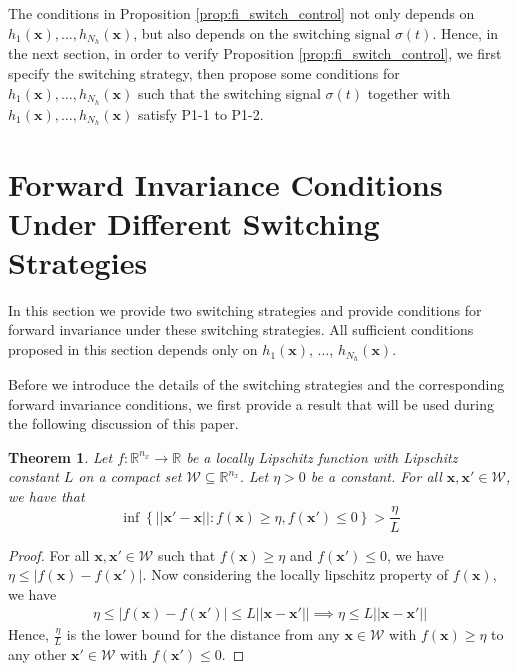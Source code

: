 \documentclass[letterpaper, 10 pt, conference]{ieeeconf}  %
\newtheorem{theorem}{Theorem}
\begin{document}
The conditions in Proposition \ref{prop:fi_switch_control} not only depends on $h_1(\mathbf{x}),...,h_{N_h}(\mathbf{x})$, but also depends on the switching signal $\sigma(t)$. Hence, in the next section, in order to verify Proposition \ref{prop:fi_switch_control}, we first specify the switching strategy, then propose some conditions for $h_1(\mathbf{x}),\dots,h_{N_h}(\mathbf{x})$ such that the switching signal $\sigma(t)$ together with $h_1(\mathbf{x}),\dots, h_{N_h}(\mathbf{x})$ satisfy P1-1 to P1-2. 
\section{Forward Invariance Conditions Under Different Switching Strategies}
\label{sec:strategies}

In this section we provide two switching strategies and provide conditions for forward invariance under these switching strategies. All sufficient conditions proposed in this section depends only on $h_1(\mathbf{x})$, $\dots$, $h_{N_h}(\mathbf{x})$. 

Before we introduce the details of the switching strategies and the corresponding forward invariance conditions, we first provide a result that will be used during the following discussion of this paper.

\begin{theorem}
\label{thm:positive_switching_dist}
     Let $f: \mathbb{R}^{n_x}\rightarrow\mathbb{R}$ be a locally Lipschitz function with Lipschitz constant $L$ on a compact set $\mathcal{W}\subseteq\mathbb{R}^{n_x}$. Let $\eta > 0$ be a constant. For all $\mathbf{x}, \mathbf{x}'\in\mathcal{W}$, we have that 
     \begin{equation*}
         \inf \left\{ ||\mathbf{x}'-\mathbf{x}|| : f(\mathbf{x})\geq \eta, f(\mathbf{x}')\leq 0 \right\} > \frac{\eta}{L}
     \end{equation*}
\end{theorem}
\begin{proof}
     For all $\mathbf{x},\mathbf{x}'\in\mathcal{W}$ such that $f(\mathbf{x})\geq \eta$ and $f(\mathbf{x}')\leq 0$, we have $\eta \leq |f(\mathbf{x}) - f(\mathbf{x}')|$. Now considering the locally lipschitz property of $f(\mathbf{x})$, we have
     \begin{align*}
         \eta \leq |f(\mathbf{x}) - f(\mathbf{x}')| \leq L||\mathbf{x}-\mathbf{x}'||
         \implies \eta \leq L||\mathbf{x}-\mathbf{x}'||
     \end{align*}
     Hence, $\frac{\eta}{L}$ is the lower bound for the distance from any $\mathbf{x}\in\mathcal{W}$ with $f(\mathbf{x})\geq\eta$ to any other $\mathbf{x}'\in\mathcal{W}$ with $f(\mathbf{x}')\leq0$.
\end{proof}
\end{document}
